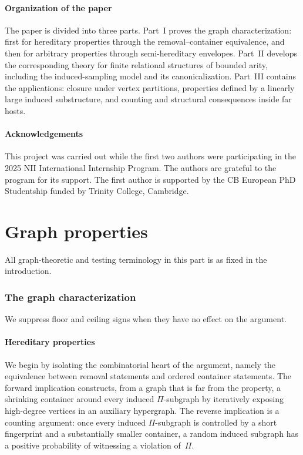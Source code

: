 \documentclass[11pt,reqno,letterpaper]{amsart}
\theoremstyle{plain}
\theoremstyle{remark}
\begin{document}
\subsection{Organization of the paper}

The paper is divided into three parts.  Part~I proves the graph
characterization: first for hereditary properties through the
removal--container equivalence, and then for arbitrary properties through
semi-hereditary envelopes.  Part~II develops the corresponding theory for
finite relational structures of bounded arity, including the induced-sampling
model and its canonicalization.  Part~III contains the applications: closure
under vertex partitions, properties defined by a linearly large induced
substructure, and counting and structural consequences inside far hosts.

\subsection*{Acknowledgements}
This project was carried out while the first two authors were participating in the 2025 NII International Internship Program.  The authors are grateful to the program for its support.  The first author is supported by the CB European PhD Studentship funded by Trinity College, Cambridge.

\part{Graph properties}

All graph-theoretic and testing terminology in this part is as fixed in the
introduction.

\section{The graph characterization}
\label{sec:graph-characterization}
We suppress floor and ceiling signs when they have no effect on the argument.
\subsection{Hereditary properties}

We begin by isolating the combinatorial heart of the argument, namely the equivalence between removal statements and ordered container statements. The forward implication constructs, from a graph that is far from the property, a shrinking container around every induced $\Pi$-subgraph by iteratively exposing high-degree vertices in an auxiliary hypergraph. The reverse implication is a counting argument: once every induced $\Pi$-subgraph is controlled by a short fingerprint and a substantially smaller container, a random induced subgraph has a positive probability of witnessing a violation of~$\Pi$.
\end{document}
